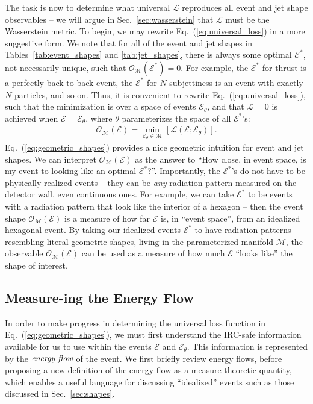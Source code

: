 \documentclass[letterpaper,11pt]{article}
\newcommand{\E}{\mathcal{E}}
\newcommand{\M}{\mathcal{M}}
\renewcommand{\O}{\mathcal{O}}
\DeclareRobustCommand{\Sec}[1]{Sec.~\ref{sec:#1}}
\DeclareRobustCommand{\Tabs}[2]{Tables~\ref{tab:#1} and \ref{tab:#2}}
\DeclareRobustCommand{\Eq}[1]{Eq.~(\ref{eq:#1})}
\begin{document}
The task is now to determine what universal $\mathcal{L}$ reproduces all event and jet shape observables -- we will argue in \Sec{wasserstein} that $\mathcal{L}$ must be the Wasserstein metric.
%
To begin, we may rewrite \Eq{universal_loss} in a more suggestive form. We note that for all of the event and jet shapes in \Tabs{event_shapes}{jet_shapes}, there is always some optimal $\E^*$, not necessarily unique, such that $\mathcal{O}_\M(\E^*) = 0$. 
%
For example, the $\E^*$ for thrust is a perfectly back-to-back event, the $\E^*$ for $N$-subjettiness is an  event with exactly $N$ particles, and so on. 
%
Thus, it is convenient to rewrite \Eq{universal_loss}, such that the minimization is over a space of events $\E_\theta$, and that $\mathcal{L} = 0$ is achieved when $\E = \E_\theta$, where  $\theta$ parameterizes the space of all $\E^*$'s:
%
\begin{align}
    \mathcal{O}_\M(\E) = \min_{\E_\theta \in \M}\left[\mathcal{L}(\E;\E_\theta)\right]. \label{eq:geometric_shapes}
\end{align}
%
\Eq{geometric_shapes} provides a nice geometric intuition for event and jet shapes.
%
We can interpret $\mathcal{O}_\M(\E)$ as the answer to ``How close, in event space, is my event to looking like an optimal $\E^*$?''.
%
Importantly, the $\E^*$'s do not have to be physically realized events -- they can be \emph{any} radiation pattern measured on the detector wall, even continuous ones. 
%
For example, we can take $\E^*$ to be events with a radiation pattern that look like the interior of a hexagon -- then the event shape $\mathcal{O}_\M(\E)$ is a measure of how far $\E$ is, in ``event space'', from an idealized hexagonal event.
%
By taking our idealized events $\E^*$ to have radiation patterns resembling literal geometric shapes, living in the parameterized manifold $\M$, the observable $\O_\M(\E)$ can be used as a measure of how much $\E$ ``looks like'' the shape of interest.




\subsection{Measure-ing the Energy Flow}\label{sec:energyflow}




In order to make progress in determining the universal loss function in \Eq{geometric_shapes}, we must first understand the IRC-safe information available for us to use within the events $\E$ and $\E_\theta$. 
%
This information is represented by the $\emph{energy flow}$ of the event. 
%
We first briefly review energy flows, before proposing a new definition of the energy flow as a measure theoretic quantity, which enables a useful language for discussing ``idealized'' events such as those discussed in \Sec{shapes}.
\end{document}
